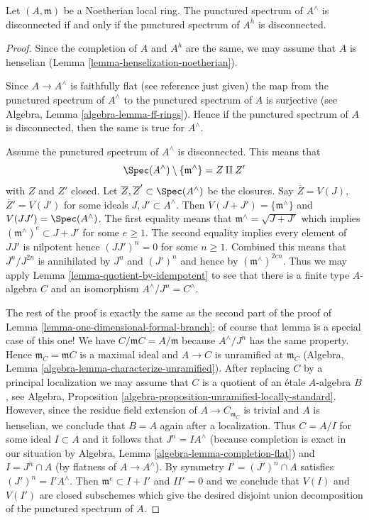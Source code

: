 \begin{lemma}
\label{lemma-completion-disconnected}
Let $(A, \mathfrak m)$ be a Noetherian local ring. The punctured spectrum
of $A^\wedge$ is disconnected if and only if the punctured spectrum of $A^h$
is disconnected.
\end{lemma}

\begin{proof}
Since the completion of $A$ and $A^h$ are the same, we may assume
that $A$ is henselian (Lemma \ref{lemma-henselization-noetherian}).

\medskip\noindent
Since $A \to A^\wedge$ is faithfully flat (see reference just given)
the map from the punctured spectrum of $A^\wedge$ to the punctured
spectrum of $A$ is surjective
(see Algebra, Lemma \ref{algebra-lemma-ff-rings}).
Hence if the punctured spectrum of $A$ is disconnected, then
the same is true for $A^\wedge$.

\medskip\noindent
Assume the punctured spectrum of $A^\wedge$ is disconnected.
This means that
$$
\Spec(A^\wedge) \setminus \{\mathfrak m^\wedge\} = Z \amalg Z'
$$
with $Z$ and $Z'$ closed. Let
$\overline{Z}, \overline{Z}' \subset \Spec(A^\wedge)$ be the closures.
Say $\overline{Z} = V(J)$, $\overline{Z}' = V(J')$ for some ideals
$J, J' \subset A^\wedge$. Then $V(J + J') = \{\mathfrak m^\wedge\}$
and $V(JJ') = \Spec(A^\wedge)$. The first equality means that
$\mathfrak m^\wedge = \sqrt{J + J'}$ which implies
$(\mathfrak m^\wedge)^e \subset J + J'$ for some $e \geq 1$.
The second equality implies every element
of $JJ'$ is nilpotent hence $(JJ')^n = 0$ for some $n \geq 1$.
Combined this means that $J^n/J^{2n}$ is annihilated by
$J^n$ and $(J')^n$ and hence by $(\mathfrak m^\wedge)^{2en}$.
Thus we may apply Lemma \ref{lemma-quotient-by-idempotent}
to see that there is a finite type $A$-algebra $C$ and an
isomorphism $A^\wedge/J^n = C^\wedge$.

\medskip\noindent
The rest of the proof is exactly the same as the second part
of the proof of Lemma \ref{lemma-one-dimensional-formal-branch};
of course that lemma is a special case of this one!
We have $C/\mathfrak m C = A/\mathfrak m$ because $A^\wedge/J^n$ has the same
property. Hence $\mathfrak m_C = \mathfrak m C$ is a maximal ideal
and $A \to C$ is unramified at $\mathfrak m_C$
(Algebra, Lemma \ref{algebra-lemma-characterize-unramified}).
After replacing $C$ by a principal localization we may
assume that $C$ is a quotient of an \'etale $A$-algebra $B$, see
Algebra, Proposition \ref{algebra-proposition-unramified-locally-standard}.
However, since the residue field extension of $A \to C_{\mathfrak m_C}$
is trivial and $A$ is henselian, we conclude that $B = A$
again after a localization.
Thus $C = A/I$ for some ideal $I \subset A$ and it follows that
$J^n = IA^\wedge$ (because completion is exact in our situation by
Algebra, Lemma \ref{algebra-lemma-completion-flat}) and $I = J^n \cap A$
(by flatness of $A \to A^\wedge$).
By symmetry $I' = (J')^n \cap A$ satisfies $(J')^n = I'A^\wedge$.
Then $\mathfrak m^e \subset I + I'$ and $II' = 0$
and we conclude that $V(I)$ and $V(I')$ are closed subschemes
which give the desired disjoint union decomposition of the
punctured spectrum of $A$.
\end{proof}